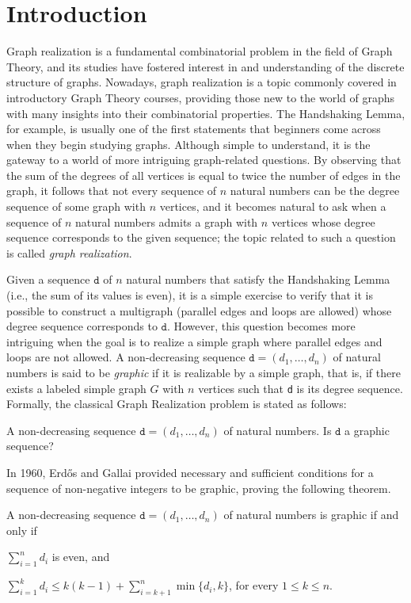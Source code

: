 \section{Introduction}
\label{sec:introduction}

Graph realization is a fundamental combinatorial problem in the field of Graph Theory, and its studies have fostered interest in and understanding of the discrete structure of graphs. Nowadays, graph realization is a topic commonly covered in introductory Graph Theory courses, providing those new to the world of graphs with many insights into their combinatorial properties.
The Handshaking Lemma, for example, is usually one of the first statements that beginners come across when they begin studying graphs. Although simple to understand, it is the gateway to a world of more intriguing graph-related questions. By observing that the sum of the degrees of all vertices is equal to twice the number of edges in the graph, it follows that not every sequence of $n$ natural numbers can be the degree sequence of some graph with $n$ vertices, and it becomes natural to ask when a sequence of $n$ natural numbers admits a graph with $n$ vertices whose degree sequence corresponds to the given sequence; the topic related to such a question is called \emph{graph realization}.

Given a sequence $\texttt{d}$ of $n$ natural numbers that satisfy the Handshaking Lemma (i.e., the sum of its values is even), it is a simple exercise to verify that it is possible to construct a multigraph (parallel edges and loops are allowed) whose degree sequence corresponds to $\texttt{d}$. However, this question becomes more intriguing when the goal is to realize a simple graph where parallel edges and loops are not allowed. A non-decreasing sequence $\texttt{d}=(d_1,\ldots,d_n)$ of natural numbers is said to be \emph{graphic} if it is realizable by a simple graph, that is, if there exists a labeled simple graph $G$ with $n$ vertices such that \texttt{d} is its degree sequence.
Formally, the classical {\sc Graph Realization} problem is stated as follows:

{A non-decreasing sequence $\texttt{d} = (d_1, \dots, d_n)$ of natural numbers.}
{Is $\texttt{d}$ a graphic sequence?}

In 1960, Erd\H{o}s and Gallai provided necessary and sufficient conditions for a sequence of non-negative integers to be graphic, proving the following theorem.

\begin{theorem}\label{erdosgallaithm}
    A non-decreasing sequence $\texttt{d} = (d_1, \dots, d_n)$ of natural numbers is graphic if and only if \\
    \begin{enumerate*}
        \item $\sum\limits_{i=1}^n d_i$ is even, and %
        \item $\sum\limits_{i=1}^k d_i \le k(k - 1) + \sum\limits_{i=k+1}^n \min\{d_i, k\}$, for every $1 \le k \le n$.
    \end{enumerate*}
\end{theorem}

